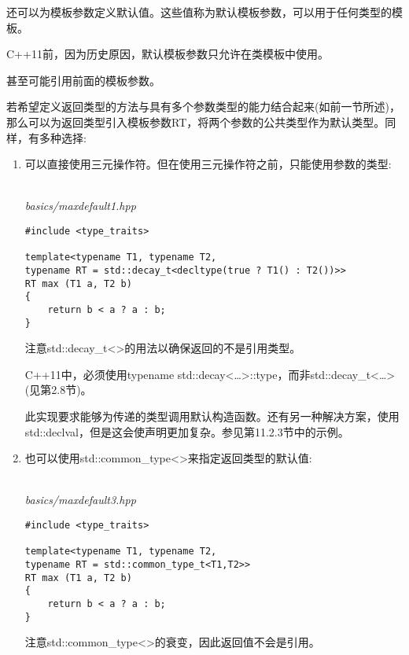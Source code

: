 还可以为模板参数定义默认值。这些值称为默认模板参数，可以用于任何类型的模板。

\begin{tcolorbox}[colback=webgreen!5!white,colframe=webgreen!75!black]
\hspace*{0.75cm}C++11前，因为历史原因，默认模板参数只允许在类模板中使用。
\end{tcolorbox}

甚至可能引用前面的模板参数。

若希望定义返回类型的方法与具有多个参数类型的能力结合起来(如前一节所述)，那么可以为返回类型引入模板参数RT，将两个参数的公共类型作为默认类型。同样，有多种选择:

\begin{enumerate}
\item 
可以直接使用三元操作符。但在使用三元操作符之前，只能使用参数的类型:

\hspace*{\fill} \\ %
\noindent
\textit{basics/maxdefault1.hpp}
\begin{lstlisting}[style=styleCXX]
#include <type_traits>

template<typename T1, typename T2,
typename RT = std::decay_t<decltype(true ? T1() : T2())>>
RT max (T1 a, T2 b)
{
	return b < a ? a : b;
}
\end{lstlisting}

注意std::decay\_t<>的用法以确保返回的不是引用类型。

\begin{tcolorbox}[colback=webgreen!5!white,colframe=webgreen!75!black]
\hspace*{0.75cm}C++11中，必须使用typename std::decay<…>::type，而非std::decay\_t<…>(见第2.8节)。
\end{tcolorbox}

此实现要求能够为传递的类型调用默认构造函数。还有另一种解决方案，使用std::declval，但是这会使声明更加复杂。参见第11.2.3节中的示例。

\item
也可以使用std::common\_type<>来指定返回类型的默认值:

\hspace*{\fill} \\ %
\noindent
\textit{basics/maxdefault3.hpp}
\begin{lstlisting}[style=styleCXX]
#include <type_traits>

template<typename T1, typename T2,
typename RT = std::common_type_t<T1,T2>>
RT max (T1 a, T2 b)
{
	return b < a ? a : b;
}
\end{lstlisting}

注意std::common\_type<>的衰变，因此返回值不会是引用。
\end{enumerate}


